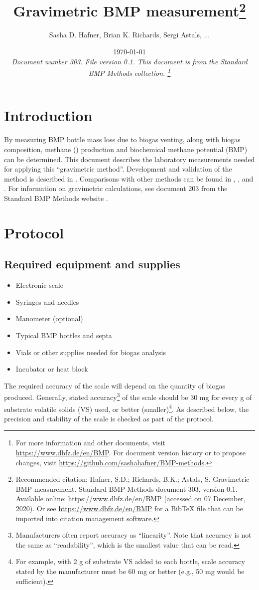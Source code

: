 \documentclass[]{article}
\title {Gravimetric BMP measurement\footnote{
  Recommended citation: 
Hafner, S.D.; Richards, B.K.; Astals, S. Gravimetric BMP measurement. Standard BMP Methods document 303, version 0.1. Available online: https://www.dbfz.de/en/BMP (accessed on 07 December, 2020).
\newline
  Or see \url{https://www.dbfz.de/en/BMP} for a BibTeX file that can be imported into citation management software.
}
}
\author{Sasha D. Hafner, Brian K. Richards, Sergi Astals, ...}
\date{\today \\
\bigskip
\textit{
  Document number 303.
  File version 0.1. 
  This document is from the Standard BMP Methods collection.
    \footnote{For more information and other documents, visit \url{https://www.dbfz.de/en/BMP}. 
    For document version history or to propose changes, visit \url{https://github.com/sashahafner/BMP-methods}.}
}
}
\begin{document}
\maketitle

\section{Introduction}
By measuring BMP bottle mass loss due to biogas venting, along with biogas composition, methane () production and biochemical methane potential (BMP) can be determined.
This document describes the laboratory measurements needed for applying this ``gravimetric method''.
Development and validation of the method is described in \citet{justesenDevelopmentValidationLowcost2019}.
Comparisons with other methods can be found in \citet{hafnerSystematicErrorManometric2019}, \citet{amodeoHowDifferentAre2020a}, and \citet{hafnerImprovingInterLaboratoryReproducibility2020}.
For information on gravimetric calculations, see document 203 from the Standard BMP Methods website \citep{BMPdoc203grav}. 

\section{Protocol}

\subsection{Required equipment and supplies}

\begin{itemize}
    \item Electronic scale
    \item Syringes and needles
    \item Manometer (optional)
    \item Typical BMP bottles and septa
    \item Vials or other supplies needed for biogas analysis
    \item Incubator or heat block
\end{itemize}

The required accuracy of the scale will depend on the quantity of biogas produced. 
Generally, stated accuracy\footnote{
  Manufacturers often report accuracy as ``linearity''. 
  Note that accuracy is not the same as ``readability'', which is the smallest value that can be read. 
} of the scale should be 30 mg for every g of substrate volatile solids (VS) used, or better (smaller)\footnote{
  For example, with 2 g of substrate VS added to each bottle, scale accuracy stated by the manufacturer must be 60 mg or better (e.g., 50 mg would be sufficient).
}.
As described below, the precision and stability of the scale is checked as part of the protocol.
\end{document}
